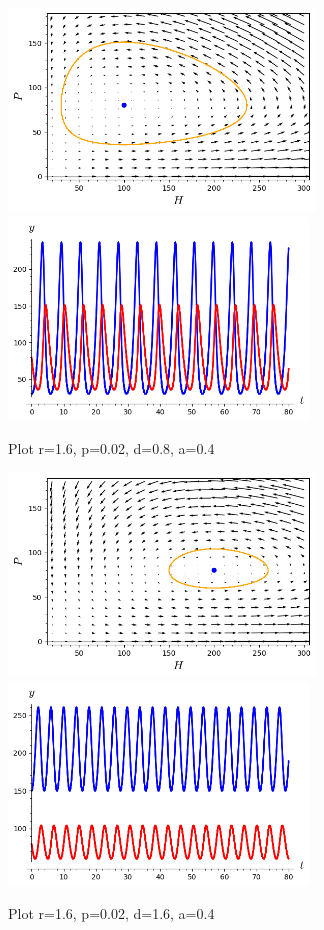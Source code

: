 \begin{figure}[h!]
\begin{center}
	\includegraphics[height=5.4cm]{Img/HP (r=1.6,p=0.02, d=0.8,a=0.4); (30, 80); (100, 80).png} \quad
	\includegraphics[height=5.4cm]{Img/T (r=1.6,p=0.02, d=0.8,a=0.4); (30, 80); (100, 80).png}
\caption{Plot r=1.6, p=0.02, d=0.8, a=0.4} \label{gdimotes}
\end{center}
\end{figure}



\begin{figure}[h!]
\begin{center}
	\includegraphics[height=5.4cm]{Img/HP (r=1.6,p=0.02, d=1.6,a=0.4); (150, 80); (200, 80).png} \quad
	\includegraphics[height=5.4cm]{Img/T (r=1.6,p=0.02, d=1.6,a=0.4); (150, 80); (200, 80).png}
\caption{Plot r=1.6, p=0.02, d=1.6, a=0.4} \label{gdimotes}
\end{center}
\end{figure}

